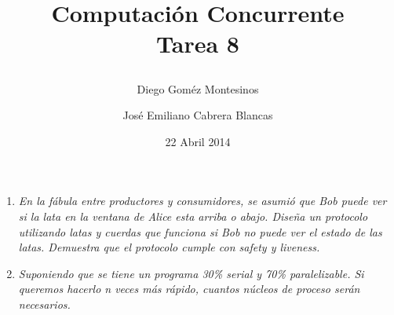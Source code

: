 \documentclass{article}
\title{ Computación Concurrente \\ \Large{Tarea 8}
\author{
  Diego Goméz Montesinos
  \and
  José Emiliano Cabrera Blancas
  }
\date{22 Abril 2014}
}
\begin{document}
\maketitle
\begin{enumerate}
  
\item{
    \textsl{
      En la fábula entre productores y consumidores, se asumió que Bob
      puede ver si la lata en la ventana de Alice esta arriba o
      abajo. Diseña un protocolo utilizando latas y cuerdas que
      funciona si Bob no puede ver el estado de las latas. Demuestra
      que el protocolo cumple con safety y liveness.
    }
  }
  
\item{
    \textsl{
      Suponiendo que se tiene un programa 30\% serial y 70\%
      paralelizable. Si queremos hacerlo n veces más rápido, cuantos
      núcleos de proceso serán necesarios.
    }
  }

\end{enumerate}
\end{document}
